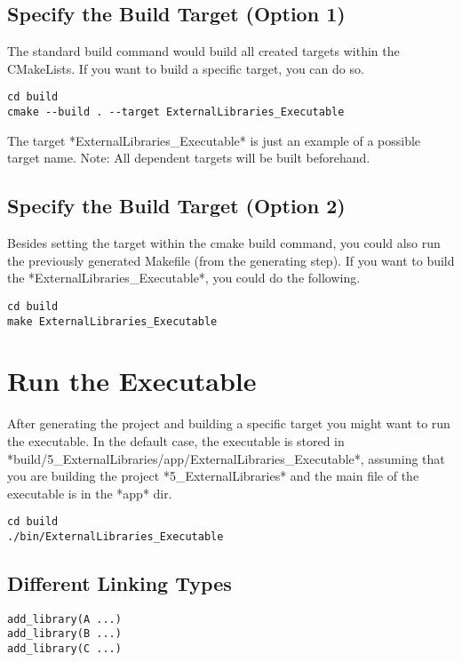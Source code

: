 \subsection{Specify the Build Target (Option 1)}

The standard build command would build all created targets within the CMakeLists.
If you want to build a specific target, you can do so.

\begin{verbatim}
cd build
cmake --build . --target ExternalLibraries_Executable
\end{verbatim}

The target *ExternalLibraries\_Executable* is just an example of a possible target name.
Note: All dependent targets will be built beforehand.

\subsection{Specify the Build Target (Option 2)}


Besides setting the target within the cmake build command, you could also run the previously generated Makefile (from the generating step).
If you want to build the *ExternalLibraries\_Executable*, you could do the following.

\begin{verbatim}
cd build
make ExternalLibraries_Executable
\end{verbatim}


\section{Run the Executable}

After generating the project and building a specific target you might want to run the executable.
In the default case, the executable is stored in *build/5\_ExternalLibraries/app/ExternalLibraries\_Executable*, assuming that you are building the project *5_ExternalLibraries* and the main file of the executable is in the *app* dir.

\begin{verbatim}
cd build
./bin/ExternalLibraries_Executable
\end{verbatim}


\subsection{Different Linking Types}

\begin{verbatim}
add_library(A ...)
add_library(B ...)
add_library(C ...)
\end{verbatim}

